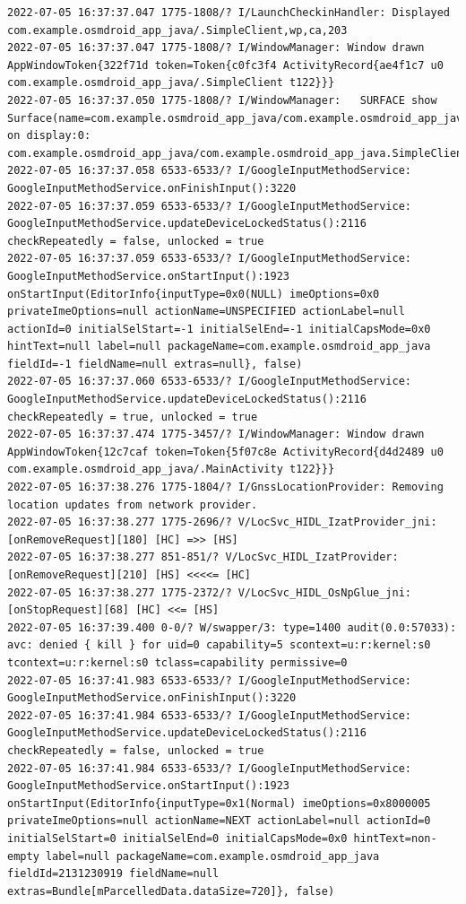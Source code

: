 \documentclass[a4paper,12pt]{book}
\begin{document}
\begin{lstlisting}
2022-07-05 16:37:37.047 1775-1808/? I/LaunchCheckinHandler: Displayed com.example.osmdroid_app_java/.SimpleClient,wp,ca,203
2022-07-05 16:37:37.047 1775-1808/? I/WindowManager: Window drawn AppWindowToken{322f71d token=Token{c0fc3f4 ActivityRecord{ae4f1c7 u0 com.example.osmdroid_app_java/.SimpleClient t122}}}
2022-07-05 16:37:37.050 1775-1808/? I/WindowManager:   SURFACE show Surface(name=com.example.osmdroid_app_java/com.example.osmdroid_app_java.SimpleClient)/@0x22b2f42 on display:0: com.example.osmdroid_app_java/com.example.osmdroid_app_java.SimpleClient
2022-07-05 16:37:37.058 6533-6533/? I/GoogleInputMethodService: GoogleInputMethodService.onFinishInput():3220 
2022-07-05 16:37:37.059 6533-6533/? I/GoogleInputMethodService: GoogleInputMethodService.updateDeviceLockedStatus():2116 checkRepeatedly = false, unlocked = true
2022-07-05 16:37:37.059 6533-6533/? I/GoogleInputMethodService: GoogleInputMethodService.onStartInput():1923 onStartInput(EditorInfo{inputType=0x0(NULL) imeOptions=0x0 privateImeOptions=null actionName=UNSPECIFIED actionLabel=null actionId=0 initialSelStart=-1 initialSelEnd=-1 initialCapsMode=0x0 hintText=null label=null packageName=com.example.osmdroid_app_java fieldId=-1 fieldName=null extras=null}, false)
2022-07-05 16:37:37.060 6533-6533/? I/GoogleInputMethodService: GoogleInputMethodService.updateDeviceLockedStatus():2116 checkRepeatedly = true, unlocked = true
2022-07-05 16:37:37.474 1775-3457/? I/WindowManager: Window drawn AppWindowToken{12c7caf token=Token{5f07c8e ActivityRecord{d4d2489 u0 com.example.osmdroid_app_java/.MainActivity t122}}}
2022-07-05 16:37:38.276 1775-1804/? I/GnssLocationProvider: Removing location updates from network provider.
2022-07-05 16:37:38.277 1775-2696/? V/LocSvc_HIDL_IzatProvider_jni: [onRemoveRequest][180] [HC] =>> [HS]
2022-07-05 16:37:38.277 851-851/? V/LocSvc_HIDL_IzatProvider: [onRemoveRequest][210] [HS] <<<<= [HC]
2022-07-05 16:37:38.277 1775-2372/? V/LocSvc_HIDL_OsNpGlue_jni: [onStopRequest][68] [HC] <<= [HS]
2022-07-05 16:37:39.400 0-0/? W/swapper/3: type=1400 audit(0.0:57033): avc: denied { kill } for uid=0 capability=5 scontext=u:r:kernel:s0 tcontext=u:r:kernel:s0 tclass=capability permissive=0
2022-07-05 16:37:41.983 6533-6533/? I/GoogleInputMethodService: GoogleInputMethodService.onFinishInput():3220 
2022-07-05 16:37:41.984 6533-6533/? I/GoogleInputMethodService: GoogleInputMethodService.updateDeviceLockedStatus():2116 checkRepeatedly = false, unlocked = true
2022-07-05 16:37:41.984 6533-6533/? I/GoogleInputMethodService: GoogleInputMethodService.onStartInput():1923 onStartInput(EditorInfo{inputType=0x1(Normal) imeOptions=0x8000005 privateImeOptions=null actionName=NEXT actionLabel=null actionId=0 initialSelStart=0 initialSelEnd=0 initialCapsMode=0x0 hintText=non-empty label=null packageName=com.example.osmdroid_app_java fieldId=2131230919 fieldName=null extras=Bundle[mParcelledData.dataSize=720]}, false)

\end{lstlisting}
\end{document}
